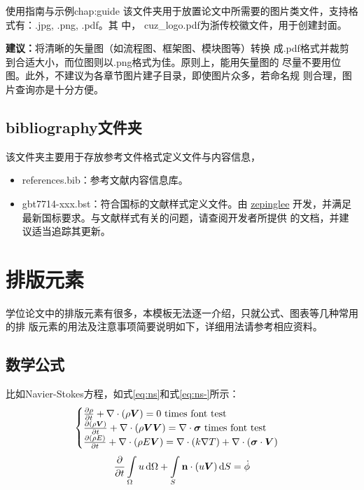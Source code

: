 \begin{cuzchapter}{使用指南与示例}{chap:guide}
	该文件夹用于放置论文中所需要的图片类文件，支持格式有：.jpg, .png, .pdf。其
	中， cuz{\_}logo.pdf为浙传校徽文件，用于创建封面。


	\begin{leftbar}
		\noindent\textbf{建议：}将清晰的矢量图（如流程图、框架图、模块图等）转换
		成.pdf格式并裁剪到合适大小，而位图则以.png格式为佳。原则上，能用矢量图的
		尽量不要用位图。此外，不建议为各章节图片建子目录，即使图片众多，若命名规
		则合理，图片查询亦是十分方便。
	\end{leftbar}

	\subsection{bibliography文件夹}\label{sub:bibliography}

	该文件夹主要用于存放参考文件格式定义文件与内容信息，

	\begin{itemize}
		\item references.bib：参考文献内容信息库。
		\item gbt7714-xxx.bst：符合国标的文献样式定义文件。由
		      \href{https://github.com/zepinglee/gbt7714-bibtex-style}{zepinglee}
		      开发，并满足最新国标要求。与文献样式有关的问题，请查阅开发者所提供
		      的文档，并建议适当追踪其更新。
	\end{itemize}

	\section{排版元素}\label{sec:elements}

	学位论文中的排版元素有很多，本模板无法逐一介绍，只就公式、图表等几种常用的排
	版元素的用法及注意事项简要说明如下，详细用法请参考相应资料。

	\subsection{数学公式}\label{sub:equations}

	比如Navier-Stokes方程，如式\eqref{eq:ns}和式\eqref{eq:ns-}所示：
	\begin{equation}
		\label{eq:ns}
		\begin{cases}
			\frac{\partial \rho}{\partial t} + \nabla\cdot(\rho\Vector{V}) = 0 \ \mathrm{times\ font\ test}                                            \\
			\frac{\partial (\rho\Vector{V})}{\partial t} + \nabla\cdot(\rho\Vector{V}\Vector{V}) = \nabla\cdot\Tensor{\sigma} \ \text{times font test} \\
			\frac{\partial (\rho E)}{\partial t} + \nabla\cdot(\rho E\Vector{V}) = \nabla\cdot(k\nabla T) + \nabla\cdot(\Tensor{\sigma}\cdot\Vector{V})
		\end{cases}
	\end{equation}
	\begin{equation}
		\label{eq:ns-}
		\frac{\partial }{\partial t}\int\limits_{\Omega} u \, \mathrm{d}\Omega + \int\limits_{S} \boldsymbol{\mathbf{n}}\cdot(u\boldsymbol{V}) \, \mathrm{d}S = \dot{\phi}
	\end{equation}


\end{cuzchapter}
